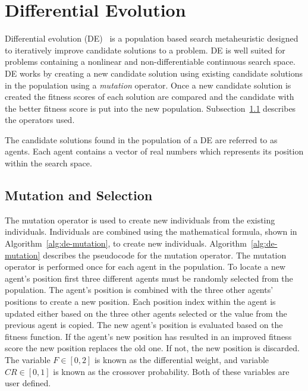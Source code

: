 \section{Differential Evolution}
\label{sec:de}

Differential evolution (DE)~\cite{storn1997differential} is a population based search metaheuristic designed to iteratively improve candidate solutions to a problem. DE is well suited for problems containing a nonlinear and non-differentiable continuous search space. DE works by creating a new candidate solution using existing candidate solutions in the population using a \textit{mutation} operator. Once a new candidate solution is created the fitness scores of each solution are compared and the candidate with the better fitness score is put into the new population. Subsection~\ref{subsec:de-mutation} describes the operators used.

The candidate solutions found in the population of a DE are referred to as agents. Each agent contains a vector of real numbers which represents its position within the search space.

\subsection{Mutation and Selection}
\label{subsec:de-mutation}

The mutation operator is used to create new individuals from the existing individuals. Individuals are combined using the mathematical formula, shown in Algorithm~\ref{alg:de-mutation}, to create new individuals. Algorithm~\ref{alg:de-mutation} describes the pseudocode for the mutation operator. The mutation operator is performed once for each agent in the population. To locate a new agent's position first three different agents must be randomly selected from the population. The agent's position is combined with the three other agents' positions to create a new position. Each position index within the agent is updated either based on the three other agents selected or the value from the previous agent is copied. The new agent's position is evaluated based on the fitness function. If the agent's new position has resulted in an improved fitness score the new position replaces the old one. If not, the new position is discarded. The variable $F \in [0,2]$ is known as the differential weight, and variable $CR \in [0,1]$ is known as the crossover probability. Both of these variables are user defined.

